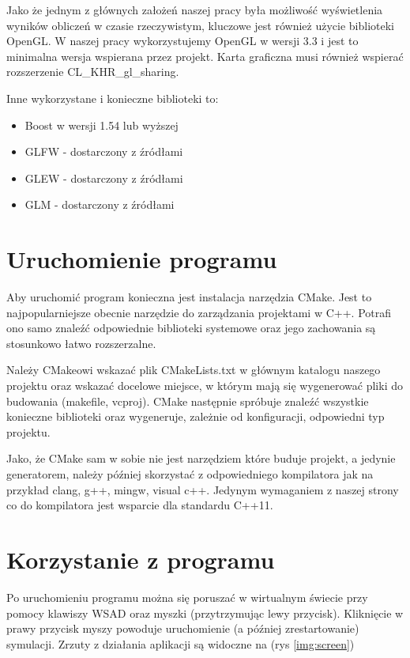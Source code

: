 \documentclass[polish, 12pt]{aghthesis}
\begin{document}
		Jako że jednym z głównych założeń naszej pracy była możliwość wyświetlenia wyników obliczeń w czasie rzeczywistym, kluczowe jest również użycie biblioteki OpenGL. W naszej pracy wykorzystujemy OpenGL w wersji 3.3 i jest to minimalna wersja wspierana przez projekt. Karta graficzna musi również wspierać rozszerzenie CL\_KHR\_gl\_sharing.
		
		Inne wykorzystane i konieczne biblioteki to:
		\begin{itemize}
		\item Boost w wersji 1.54 lub wyższej
		\item GLFW - dostarczony z źródłami
		\item GLEW - dostarczony z źródłami
		\item GLM - dostarczony z źródłami
		\end{itemize}
		
	\section{Uruchomienie programu}
		Aby uruchomić program konieczna jest instalacja narzędzia CMake. Jest to najpopularniejsze obecnie narzędzie do zarządzania projektami w C++. Potrafi ono samo znaleźć odpowiednie biblioteki systemowe oraz jego zachowania są stosunkowo łatwo rozszerzalne.
		
		Należy CMakeowi wskazać plik CMakeLists.txt w głównym katalogu naszego projektu oraz wskazać docelowe miejsce, w którym mają się wygenerować pliki do budowania (makefile, vcproj). CMake następnie spróbuje znaleźć wszystkie konieczne biblioteki oraz wygeneruje, zależnie od konfiguracji, odpowiedni typ projektu.
		
		 Jako, że CMake sam w sobie nie jest narzędziem które buduje projekt, a jedynie generatorem, należy później skorzystać z odpowiedniego kompilatora jak na przykład clang, g++, mingw, visual c++. Jedynym wymaganiem z naszej strony co do kompilatora jest wsparcie dla standardu C++11.
		 
	\section{Korzystanie z programu}
		Po uruchomieniu programu można się poruszać w wirtualnym świecie przy pomocy klawiszy WSAD oraz myszki (przytrzymując lewy przycisk). Kliknięcie w prawy przycisk myszy powoduje uruchomienie (a później zrestartowanie) symulacji.
		Zrzuty z działania aplikacji są widoczne na (rys \ref{img:screen})
		
\end{document}
